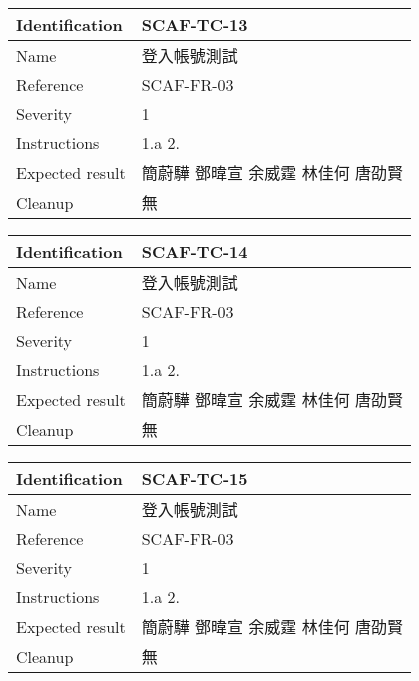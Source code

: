 \documentclass{report}
\begin{document}
\begin{tabularx}{0.9\textwidth}{
  |p{}%
  |p{}|%
  }
  \hline
  \centering Identification &  SCAF-TC-13 \\
  \hline
  \centering Name & 登入帳號測試 \\
  \hline
  \centering Reference & SCAF-FR-03 \\
  \hline
  \centering Severity & 1 \\
  \hline
  \centering Instructions & 1.a
                            2. \\
  \hline
  \centering Expected result & 簡蔚驊 \! 鄧暐宣 \! 余威霆 \! 林佳何 \! 唐劭賢 \\
  \hline
  \centering Cleanup & 無 \\
  \hline
\end{tabularx}
\newline\newline

\begin{tabularx}{0.9\textwidth}{
  |p{}%
  |p{}|%
  }
  \hline
  \centering Identification &  SCAF-TC-14 \\
  \hline
  \centering Name & 登入帳號測試 \\
  \hline
  \centering Reference & SCAF-FR-03 \\
  \hline
  \centering Severity & 1 \\
  \hline
  \centering Instructions & 1.a
                            2. \\
  \hline
  \centering Expected result & 簡蔚驊 \! 鄧暐宣 \! 余威霆 \! 林佳何 \! 唐劭賢 \\
  \hline
  \centering Cleanup & 無 \\
  \hline
\end{tabularx}
\newline\newline

\begin{tabularx}{0.9\textwidth}{
  |p{}%
  |p{}|%
  }
  \hline
  \centering Identification &  SCAF-TC-15 \\
  \hline
  \centering Name & 登入帳號測試 \\
  \hline
  \centering Reference & SCAF-FR-03 \\
  \hline
  \centering Severity & 1 \\
  \hline
  \centering Instructions & 1.a
                            2. \\
  \hline
  \centering Expected result & 簡蔚驊 \! 鄧暐宣 \! 余威霆 \! 林佳何 \! 唐劭賢 \\
  \hline
  \centering Cleanup & 無 \\
  \hline
\end{tabularx}
\newline\newline
\end{document}
